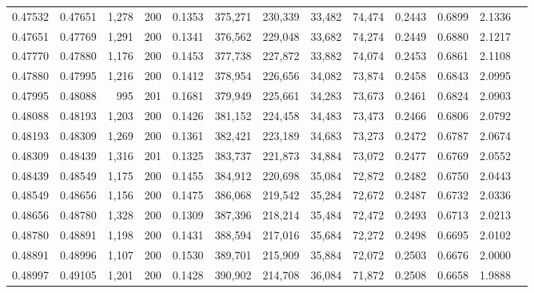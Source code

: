 \begin{tabular}{rrrrrrrrrrrrr}
0.47532 & 0.47651 & 1,278 & 200 &                                     0.1353 & 375,271 & 230,339 &  33,482 &  74,474 & 0.2443 & 0.6899 & 2.1336 \\
0.47651 & 0.47769 & 1,291 & 200 &                                     0.1341 & 376,562 & 229,048 &  33,682 &  74,274 & 0.2449 & 0.6880 & 2.1217 \\
0.47770 & 0.47880 & 1,176 & 200 &                                     0.1453 & 377,738 & 227,872 &  33,882 &  74,074 & 0.2453 & 0.6861 & 2.1108 \\
0.47880 & 0.47995 & 1,216 & 200 &                                     0.1412 & 378,954 & 226,656 &  34,082 &  73,874 & 0.2458 & 0.6843 & 2.0995 \\
0.47995 & 0.48088 &   995 & 201 &                                     0.1681 & 379,949 & 225,661 &  34,283 &  73,673 & 0.2461 & 0.6824 & 2.0903 \\
0.48088 & 0.48193 & 1,203 & 200 &                                     0.1426 & 381,152 & 224,458 &  34,483 &  73,473 & 0.2466 & 0.6806 & 2.0792 \\
0.48193 & 0.48309 & 1,269 & 200 &                                     0.1361 & 382,421 & 223,189 &  34,683 &  73,273 & 0.2472 & 0.6787 & 2.0674 \\
0.48309 & 0.48439 & 1,316 & 201 &                                     0.1325 & 383,737 & 221,873 &  34,884 &  73,072 & 0.2477 & 0.6769 & 2.0552 \\
0.48439 & 0.48549 & 1,175 & 200 &                                     0.1455 & 384,912 & 220,698 &  35,084 &  72,872 & 0.2482 & 0.6750 & 2.0443 \\
0.48549 & 0.48656 & 1,156 & 200 &                                     0.1475 & 386,068 & 219,542 &  35,284 &  72,672 & 0.2487 & 0.6732 & 2.0336 \\
0.48656 & 0.48780 & 1,328 & 200 &                                     0.1309 & 387,396 & 218,214 &  35,484 &  72,472 & 0.2493 & 0.6713 & 2.0213 \\
0.48780 & 0.48891 & 1,198 & 200 &                                     0.1431 & 388,594 & 217,016 &  35,684 &  72,272 & 0.2498 & 0.6695 & 2.0102 \\
0.48891 & 0.48996 & 1,107 & 200 &                                     0.1530 & 389,701 & 215,909 &  35,884 &  72,072 & 0.2503 & 0.6676 & 2.0000 \\
0.48997 & 0.49105 & 1,201 & 200 &                                     0.1428 & 390,902 & 214,708 &  36,084 &  71,872 & 0.2508 & 0.6658 & 1.9888 \\

\end{tabular}
